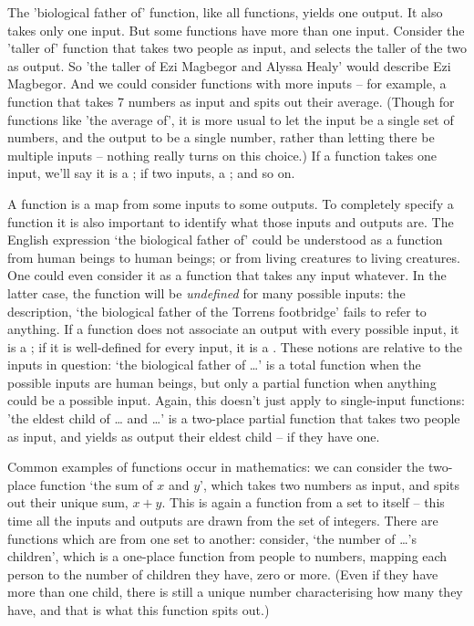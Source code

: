 The 'biological father of' function, like all functions, yields one output. It also takes only one input. But some functions have more than one input. Consider the 'taller of' function that takes two people as input, and selects the taller of the two as output. So 'the taller of Ezi Magbegor and Alyssa Healy' would describe Ezi Magbegor. And we could consider functions with more inputs – for example, a function that takes 7 numbers as input and spits out their average. (Though for functions like 'the average of', it is more usual to let the input be a single set of numbers, and the output to be a single number, rather than letting there be multiple inputs – nothing really turns on this choice.) If a function takes one input, we'll say it is a ; if two inputs, a ; and so on.

A function is a map from some inputs to some outputs. To completely specify a function it is also important to identify what those inputs and outputs are. The English expression `the biological father of' could be understood as a function from human beings to human beings; or from living creatures to living creatures. One could even consider it as a function that takes any input whatever. In the latter case, the function will be \emph{undefined} for many possible inputs: the description, `the biological father of the Torrens footbridge' fails to refer to anything. If a function does not associate an output with every possible input, it is a ; if it is well-defined for every input, it is a . These notions are relative to the inputs in question: `the biological father of …' is a total function when the possible inputs are human beings, but only a partial function when anything could be a possible input. Again, this doesn't just apply to single-input functions: 'the eldest child of … and …' is a two-place partial function that takes two people as input, and yields as output their eldest child – if they have one.

Common examples of functions occur in mathematics: we can consider the two-place function `the sum of $x$ and $y$', which takes two numbers as input, and spits out their unique sum, $x+y$. This is again a function from a set to itself – this time all the inputs and outputs are drawn from the set of integers. There are functions which are from one set to another: consider, `the number of …'s children', which is a one-place function from people to numbers, mapping each person to the number of children they have, zero or more. (Even if they have more than one child, there is still a unique number characterising how many they have, and that is what this function spits out.)  

